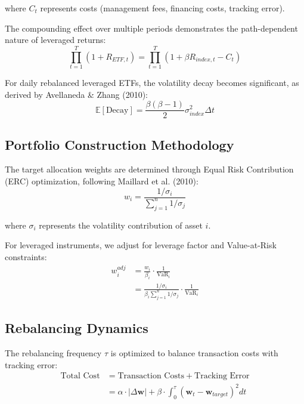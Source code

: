\documentclass[onecolumn,ieee]{arithmaxresearch}
\begin{document}
where $C_t$ represents costs (management fees, financing costs, tracking error).

The compounding effect over multiple periods demonstrates the path-dependent nature of leveraged returns:
\begin{equation}
\prod_{t=1}^T (1 + R_{ETF,t}) = \prod_{t=1}^T (1 + \beta R_{index,t} - C_t)
\end{equation}

For daily rebalanced leveraged ETFs, the volatility decay becomes significant, as derived by Avellaneda \& Zhang (2010):
\begin{equation}
\mathbb{E}[\text{Decay}] = \frac{\beta(\beta-1)}{2} \sigma^2_{index} \Delta t
\end{equation}

\subsection{Portfolio Construction Methodology}

The target allocation weights are determined through Equal Risk Contribution (ERC) optimization, following Maillard et al. (2010):
\begin{equation}
w_i = \frac{1/\sigma_i}{\sum_{j=1}^n 1/\sigma_j}
\end{equation}

where $\sigma_i$ represents the volatility contribution of asset $i$.

For leveraged instruments, we adjust for leverage factor and Value-at-Risk constraints:
\begin{equation}
\begin{aligned}
w_i^{adj} &= \frac{w_i}{\beta_i} \cdot \frac{1}{\text{VaR}_i} \\
&= \frac{1/\sigma_i}{\beta_i \sum_{j=1}^n 1/\sigma_j} \cdot \frac{1}{\text{VaR}_i}
\end{aligned}
\end{equation}

\subsection{Rebalancing Dynamics}

The rebalancing frequency $\tau$ is optimized to balance transaction costs with tracking error:
\begin{align}
\text{Total Cost} &= \text{Transaction Costs} + \text{Tracking Error} \\
&= \alpha \cdot |\Delta \mathbf{w}| + \beta \cdot \int_0^\tau (\mathbf{w}_t - \mathbf{w}_{target})^2 dt
\end{align}
\end{document}
